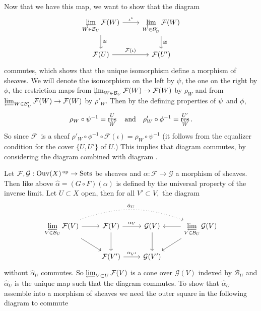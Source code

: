 \documentclass[a4paper,11pt,english]{article}
\DeclareMathOperator{\op}{^{op}}
\DeclareMathOperator{\Ouv}{Ouv}
\DeclareMathOperator{\res}{res}
\newcommand{\B}{\mathcal{B}}
\newcommand{\F}{\mathcal{F}}
\newcommand{\G}{\mathcal{G}}
\begin{document}
\begin{exercise}[2]
Now that we have this map, we want to show that the diagram
\begin{equation}
\label{dg:2}
\begin{tikzcd}
\invlim\limits_{W \in \B_U} \F(W) \arrow[r, "\iota^*"] \arrow[d, "\cong"]
& \invlim\limits_{W \in \B_U'} \F(W) \arrow[d, "\cong"] \\
\F(U) \arrow[r, "\F(\iota)"] & \F(U')
\end{tikzcd}
\end{equation}
commutes, which shows that the unique isomorphism define a morphism of sheaves. 
We will denote the isomorphism on the left by $\psi$, the one on the right by
$\phi$, the restriction maps from $\invlim_{W \in \B_U} \F(W) \to \F(W)$ by
$\rho_W$ and from $\invlim_{W \in \B_U'} \F(W) \to \F(W)$ by $\rho'_W$. Then by
the defining properties of $\psi$ and $\phi$, 
\begin{equation}
\label{eq:1}
\rho_W \circ \psi^{-1} = \res^U_W \qq\tand \rho'_W \circ \phi^{-1} =
\res^{U'}_W. 
\end{equation}
So since $\F$ is a sheaf $\rho'_W \circ \phi^{-1} \circ \F(\iota) = \rho_W \circ
\psi^{-1}$ (it follows from the equalizer condition for the cover
$\{ U, U' \}$ of $U$.) This implies that diagram  commutes, by
considering the diagram combined with diagram .



\newcommand{\ha}{\hat{\alpha}}

Let $\F, \G : \Ouv(X)\op \to \Sets$ be sheaves and $\alpha: \F \to \G$ a
morphism of sheaves. Then like above $\ha = (G \circ F)(\alpha)$ is defined by
the universal property of the inverse limit.
Let $U\subset X$ open, then for all $V' \subset V$, the diagram
\begin{equation}
\begin{tikzcd}
\label{eq:5}
\invlim\limits_{V \in \B_U} \F(V) \arrow[r] \arrow[rrr, bend left=20, dotted, "\ha_U"]
\arrow[rd]
& \F(V) \arrow[r, "\alpha_V"] \arrow[d]
& \G(V) \arrow[d]
& \invlim\limits_{V \in \B_U} \G(V) \arrow[l] \arrow[ld] \\
& \F(V') \arrow[r, "\alpha_{V'}"]
& \G(V')
\end{tikzcd} 
\end{equation}
without $\ha_U$ commutes. So $\invlim_{V \subset U} \F(V)$ is a cone over $\G(V)$ indexed by
$\B_U$ and $\ha_U$ is the unique map such that the diagram commutes. 
To show that $\ha_U$ assemble into a morphism of sheaves we need the outer
square in the following diagram to commute


\end{exercise}
\end{document}
